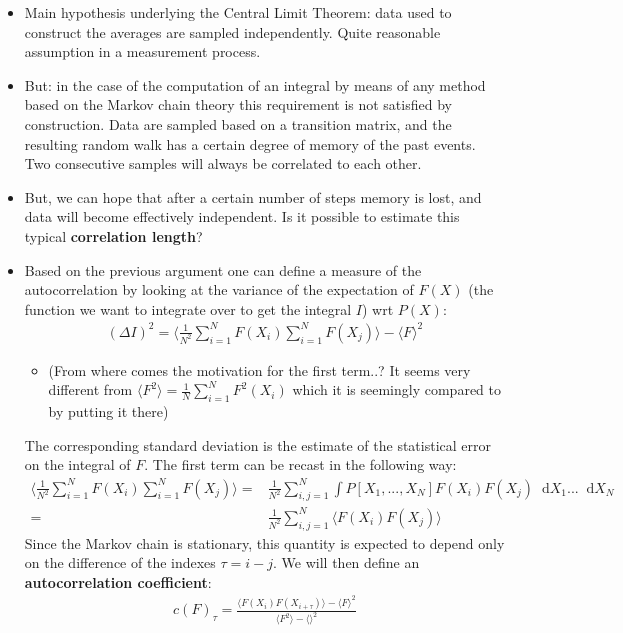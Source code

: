 \documentclass[twoside,english]{uiofysmaster}
\newcommand*\dif{\mathop{}\!\mathrm{d}}
\begin{document}
\begin{itemize}
	\item Main hypothesis underlying the Central Limit Theorem: data used to construct the averages are sampled independently. Quite reasonable assumption in a measurement process.
	\item But: in the case of the computation of an integral by means of any method based on the Markov chain theory this requirement is not satisfied by construction. Data are sampled based on a transition matrix, and the resulting random walk has a certain degree of memory of the past events. Two consecutive samples will always be correlated to each other.
	\item But, we can hope that after a certain number of steps memory is lost, and data will become effectively independent. Is it possible to estimate this typical \textbf{correlation length}?
	\item Based on the previous argument one can define a measure of the autocorrelation by looking at the variance of the expectation of $F(X)$ (the function we want to integrate over to get the integral $I$) wrt $P(X)$:
	\begin{align}
		(\Delta I)^2 = \langle \frac{1}{N^2} \sum_{i=1}^N F(X_i) \sum_{i=1}^N F(X_j) \rangle - \langle F \rangle^2
	\end{align}
	\begin{itemize}
		\item (From where comes the motivation for the first term..? It seems very different from $\langle F^2 \rangle = \frac{1}{N} \sum_{i=1}^N F^2(X_i)$ which it is seemingly compared to by putting it there)
	\end{itemize}
	The corresponding standard deviation is the estimate of the statistical error on the integral of $F$. The first term can be recast in the following way:
	\begin{align}
		\langle \frac{1}{N^2} \sum_{i=1}^N F(X_i) \sum_{i=1}^N F(X_j) \rangle 
		=& \frac{1}{N^2} \sum_{i,j=1}^N \int P[X_1, ..., X_N] F(X_i) F(X_j) \dif X_1 ... \dif X_N \\
		=& \frac{1}{N^2} \sum_{i,j=1}^N \langle F(X_i) F(X_j) \rangle
	\end{align}
	Since the Markov chain is stationary, this quantity is expected to depend only on the difference of the indexes $\tau = i-j$. We will then define an \textbf{autocorrelation coefficient}:
	\begin{align}
		c(F)_\tau = \frac{\langle F(X_i) F(X_{i+\tau}) \rangle - \langle F \rangle^2}
		{ \langle F^2 \rangle - \langle  \rangle^2 }

\end{align}
\end{itemize}
\end{document}
